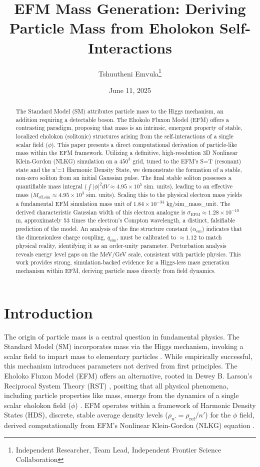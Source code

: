 \documentclass[11pt]{article}
\title{EFM Mass Generation: Deriving Particle Mass from Eholokon Self-Interactions}
\author{Tshuutheni Emvula\thanks{Independent Researcher, Team Lead, Independent Frontier Science Collaboration}}
\date{June 11, 2025}
\begin{document}
\maketitle

\begin{abstract}
The Standard Model (SM) attributes particle mass to the Higgs mechanism, an addition requiring a detectable boson. The Ehokolo Fluxon Model (EFM) offers a contrasting paradigm, proposing that mass is an intrinsic, emergent property of stable, localized eholokon (solitonic) structures arising from the self-interactions of a single scalar field (\(\phi\)). This paper presents a direct computational derivation of particle-like mass within the EFM framework. Utilizing a definitive, high-resolution 3D Nonlinear Klein-Gordon (NLKG) simulation on a \(450^3\) grid, tuned to the EFM's S=T (resonant) state and the n'=1 Harmonic Density State, we demonstrate the formation of a stable, non-zero soliton from an initial Gaussian pulse. The final stable soliton possesses a quantifiable mass integral (\(\int|\phi|^2 dV \approx 4.95 \times 10^5\) sim. units), leading to an effective mass (\(M_{\text{eff,sim}} \approx 4.95 \times 10^3\) sim. units). Scaling this to the physical electron mass yields a fundamental EFM simulation mass unit of \(1.84 \times 10^{-34}\) kg/sim\_mass\_unit. The derived characteristic Gaussian width of this electron analogue is \( \sigma_{\text{EFM}} \approx 1.28 \times 10^{-10} \) m, approximately 53 times the electron's Compton wavelength, a distinct, falsifiable prediction of the model. An analysis of the fine structure constant (\(\alpha_{\text{em}}\)) indicates that the dimensionless charge coupling, \(q_{\text{sim}}\), must be calibrated to \( \approx 1.12 \) to match physical reality, identifying it as an order-unity parameter. Perturbation analysis reveals energy level gaps on the MeV/GeV scale, consistent with particle physics. This work provides strong, simulation-backed evidence for a Higgs-less mass generation mechanism within EFM, deriving particle mass directly from field dynamics.
\end{abstract}

\section{Introduction}
The origin of particle mass is a central question in fundamental physics. The Standard Model (SM) incorporates mass via the Higgs mechanism, invoking a scalar field to impart mass to elementary particles \citep{SMReviewPlaceholder}. While empirically successful, this mechanism introduces parameters not derived from first principles. The Eholoko Fluxon Model (EFM) offers an alternative, rooted in Dewey B. Larson's Reciprocal System Theory (RST) \citep{larson1959}, positing that all physical phenomena, including particle properties like mass, emerge from the dynamics of a single scalar eholokon field (\(\phi\)) \citep{emvula2025compendium_intro}. EFM operates within a framework of Harmonic Density States (HDS), discrete, stable average density levels (\(\rho_{n'} = \rho_{\text{ref}}/n'\)) for the \(\phi\) field, derived computationally from EFM's Nonlinear Klein-Gordon (NLKG) equation \citep{emvula2025efm_hds_validated}.
\end{document}
